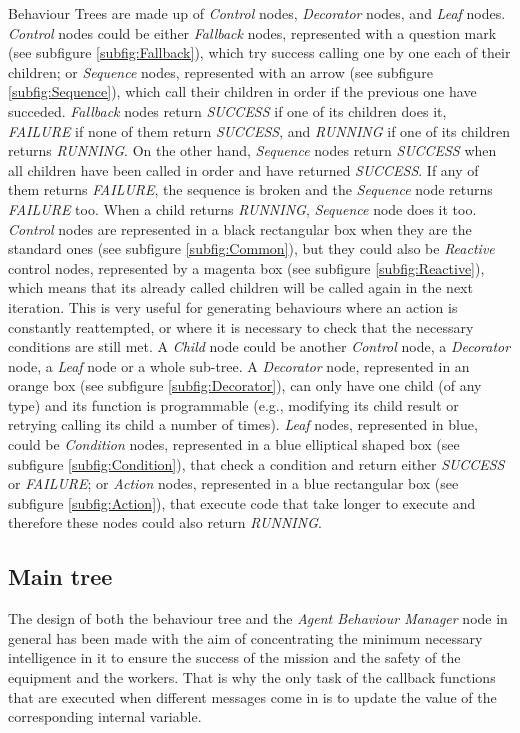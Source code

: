  Behaviour Trees are made up of \emph{Control} nodes, \emph{Decorator} nodes, and \emph{Leaf} nodes. \emph{Control} nodes could be either \emph{Fallback} nodes, represented with a question mark (see subfigure \ref{subfig:Fallback}), which try success calling one by one each of their children; or \emph{Sequence} nodes, represented with an arrow (see subfigure \ref{subfig:Sequence}), which call their children in order if the previous one have succeded. \emph{Fallback} nodes return \emph{SUCCESS} if one of its children does it, \emph{FAILURE} if none of them return \emph{SUCCESS}, and \emph{RUNNING} if one of its children returns \emph{RUNNING}. On the other hand, \emph{Sequence} nodes return \emph{SUCCESS} when all children have been called in order and have returned \emph{SUCCESS}. If any of them returns \emph{FAILURE}, the sequence is broken and the \emph{Sequence} node returns \emph{FAILURE} too. When a child returns \emph{RUNNING}, \emph{Sequence} node does it too. \emph{Control} nodes are represented in a black rectangular box when they are the standard ones (see subfigure \ref{subfig:Common}), but they could also be \emph{Reactive} control nodes, represented by a magenta box (see subfigure \ref{subfig:Reactive}), which means that its already called children will be called again in the next iteration. This is very useful for generating behaviours where an action is constantly reattempted, or where it is necessary to check that the necessary conditions are still met. A \emph{Child} node could be another \emph{Control} node, a \emph{Decorator} node, a \emph{Leaf} node or a whole sub-tree. A \emph{Decorator} node, represented in an orange box (see subfigure \ref{subfig:Decorator}), can only have one child (of any type) and its function is programmable (e.g., modifying its child result or retrying calling its child a number of times). \emph{Leaf} nodes, represented in blue, could be \emph{Condition} nodes, represented in a blue elliptical shaped box (see subfigure \ref{subfig:Condition}), that check a condition and return either \emph{SUCCESS} or \emph{FAILURE}; or \emph{Action} nodes, represented in a blue rectangular box (see subfigure \ref{subfig:Action}), that execute code that take longer to execute and therefore these nodes could also return \emph{RUNNING}.

\subsection{Main tree}
\label{sec:MainTree}
The design of both the behaviour tree and the \emph{Agent Behaviour Manager} node in general has been made with the aim of concentrating the minimum necessary intelligence in it to ensure the success of the mission and the safety of the equipment and the workers. That is why the only task of the callback functions that are executed when different messages come in is to update the value of the corresponding internal variable. 

